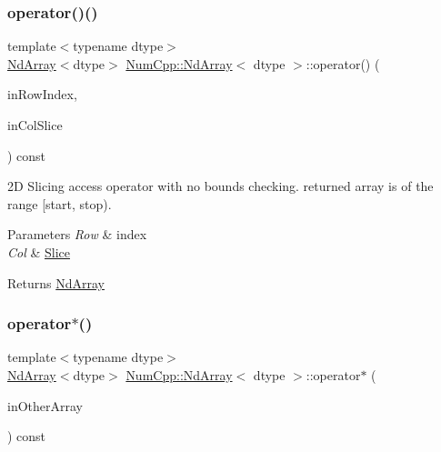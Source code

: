 \subsubsection{\texorpdfstring{operator()()}{operator()()}\hspace{0.1cm}{\footnotesize\ttfamily [5/5]}}
{\footnotesize\ttfamily template$<$typename dtype$>$ \\
\mbox{\hyperlink{class_num_cpp_1_1_nd_array}{Nd\+Array}}$<$dtype$>$ \mbox{\hyperlink{class_num_cpp_1_1_nd_array}{Num\+Cpp\+::\+Nd\+Array}}$<$ dtype $>$\+::operator() (\begin{DoxyParamCaption}\item[{\mbox{\hyperlink{namespace_num_cpp_acf3eb1592f8b248ff0a236634864633c}{int32}}}]{in\+Row\+Index,  }\item[{const \mbox{\hyperlink{class_num_cpp_1_1_slice}{Slice}} \&}]{in\+Col\+Slice }\end{DoxyParamCaption}) const\hspace{0.3cm}{\ttfamily [inline]}}

2D Slicing access operator with no bounds checking. returned array is of the range \mbox{[}start, stop).


\begin{DoxyParams}{Parameters}
{\em Row} & index \\
\hline
{\em Col} & \mbox{\hyperlink{class_num_cpp_1_1_slice}{Slice}} \\
\hline
\end{DoxyParams}
\begin{DoxyReturn}{Returns}
\mbox{\hyperlink{class_num_cpp_1_1_nd_array}{Nd\+Array}} 
\end{DoxyReturn}
\mbox{\label{class_num_cpp_1_1_nd_array_aa1b1026b5e8ec836e8b8a5c691ac39ef}} 
\subsubsection{\texorpdfstring{operator$\ast$()}{operator*()}\hspace{0.1cm}{\footnotesize\ttfamily [1/2]}}
{\footnotesize\ttfamily template$<$typename dtype$>$ \\
\mbox{\hyperlink{class_num_cpp_1_1_nd_array}{Nd\+Array}}$<$dtype$>$ \mbox{\hyperlink{class_num_cpp_1_1_nd_array}{Num\+Cpp\+::\+Nd\+Array}}$<$ dtype $>$\+::operator$\ast$ (\begin{DoxyParamCaption}\item[{const \mbox{\hyperlink{class_num_cpp_1_1_nd_array}{Nd\+Array}}$<$ dtype $>$ \&}]{in\+Other\+Array }\end{DoxyParamCaption}) const\hspace{0.3cm}{\ttfamily [inline]}}

